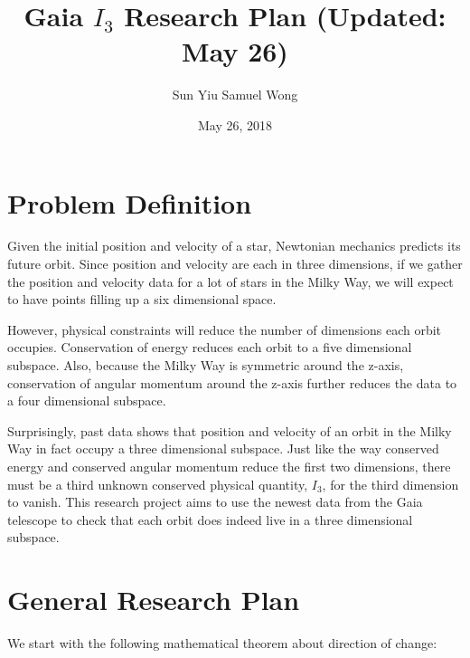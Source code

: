 \documentclass[12pt]{article}
\begin{document}
\title{Gaia $I_3$ Research Plan (Updated: May 26)}
\author{Sun Yiu Samuel Wong}
\date{May 26, 2018}
\maketitle

\newtheorem{theorem}{Theorem}
\newtheorem{assumption}{Assumption}
\newtheorem*{hypothesis}{Hypothesis}

\section{Problem Definition}
Given the initial position and velocity of a star, Newtonian mechanics predicts its future orbit. Since position and velocity are each in three dimensions, if we gather the position and velocity data for a lot of stars in the Milky Way, we will expect to have points filling up a six dimensional space.

However, physical constraints will reduce the number of dimensions each orbit occupies. Conservation of energy reduces each orbit to a five dimensional subspace. Also, because the Milky Way is symmetric around the z-axis, conservation of angular momentum around the z-axis further reduces the data to a four dimensional subspace.

Surprisingly, past data shows that position and velocity of an orbit in the Milky Way in fact occupy a three dimensional subspace. Just like the way conserved energy and conserved angular momentum reduce the first two dimensions, there must be a third unknown conserved physical quantity, $I_3$, for the third dimension to vanish. This research project aims to use the newest data from the Gaia telescope to check that each orbit does indeed live in a three dimensional subspace.

\section{General Research Plan}
We start with the following mathematical theorem about direction of change: 
\end{document}
